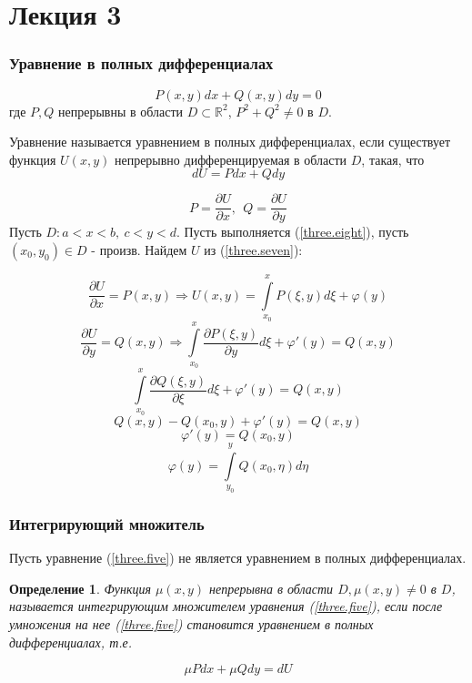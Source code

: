 \documentclass{article}
\newtheorem*{df}{Определение}
\newcommand{\pd}[2]{\frac{\partial {#1}}{\partial {#2}}}
\newcommand{\re}[1]{(\ref{#1})}
\begin{document}
  \section{Лекция 3}
  \subsubsection{Уравнение в полных дифференциалах}
  \begin{equation}
  \label{three.five}
  \boxed{P(x, y)dx + Q(x,y)dy = 0}
  \end{equation} 
  где $P, Q$ непрерывны в области $D \subset \mathbb{R}^2$, $P^2 + Q^2 \neq 0$ в $D$. 
  
  Уравнение называется уравнением в полных дифференциалах, если существует функция $U(x, y)$ непрерывно дифференцируемая в области $D$, такая, что 
  \begin{equation}
    \label{three.seven}
    dU = Pdx + Qdy
  \end{equation}

  \begin{equation}
    \label{three.eight}
    P = \pd{U}{x}, ~~ Q = \pd{U}{y}
  \end{equation} 
  Пусть $D: a < x < b,~ c < y < d$. Пусть выполняется (\ref{three.eight}), пусть $(x_0, y_0) \in D$ - произв. Найдем $U$ из \re{three.seven}:

  \[ \pd{U}{x} = P(x, y) \Rightarrow U(x, y) = \int\limits_{x_0}^xP(\xi, y)d\xi + \varphi(y) \]
  \[ \pd{U}{y} = Q(x, y) \Rightarrow \int\limits_{x_0}^{x}\pd{P(\xi, y)}{y}d\xi + \varphi'(y) = Q(x, y) \]
  \[ \int\limits_{x_0}^{x}\pd{Q(\xi, y)}{\xi}d\xi + \varphi'(y) = Q(x, y) \]
  \[ Q(x, y) - Q(x_0, y) + \varphi'(y) = Q(x ,y) \]
  \[ \varphi'(y) = Q(x_0, y) \]
  \[ \varphi(y) = \int\limits_{y_0}^{y}Q(x_0, \eta)d\eta \]

  \subsubsection{Интегрирующий множитель}
  Пусть уравнение \re{three.five} не является уравнением в полных дифференциалах.
  \begin{df}
  Функция $\mu(x, y)$ непрерывна в области $D, \mu(x, y) \neq 0$ в $D$, называется интегрирующим множителем уравнения \re{three.five}, если после умножения на нее \re{three.five} становится уравнением в полных дифференциалах, т.е.

  \[ \mu Pdx + \mu Qdy = dU \]
  \end{df}
\end{document}
